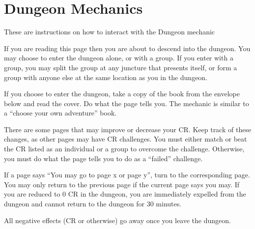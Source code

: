 \documentclass[green]{guildcamp2}
\begin{document}
\name{\gDungeonDirections{}}

\section{Dungeon Mechanics}
These are instructions on how to interact with the Dungeon mechanic

\begin{enum}[Directions]
	\item If you are reading this page then you are about to descend into the dungeon. You may choose to enter the dungeon alone, or with a group. If you enter with a group, you may split the group at any juncture that presents itself, or form a group with anyone else at the same location as you in the dungeon.
	\item If you choose to enter the dungeon, take a copy of the book from the envelope below and read the cover. Do what the page tells you. The mechanic is similar to a ``choose your own adventure'' book. 
	\item There are some pages that may improve or decrease your CR. Keep track of these changes, as other pages may have  CR challenges. You must either match or beat the CR listed as an individual or a group to overcome the challenge. Otherwise, you must do what the page tells you to do as a ``failed'' challenge. 
	\item If a page says ``You may go to page x or page y'', turn to the corresponding page. You may only return to the previous page if the current page says you may. If you are reduced to 0 CR in the dungeon, you are immediately expelled from the dungeon and cannot return to the dungeon for 30 minutes. 
	\item All negative effects (CR or otherwise) go away once you leave the dungeon.
\end{enum}
	
\end{document}
